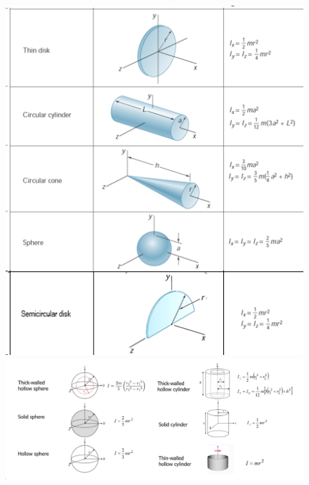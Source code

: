 \documentclass[10pt]{article}
\begin{document}
\begin{multicols*}{2}
\begin{figure}[H]
			\includegraphics[width=0.9\linewidth]{screenshot004}
			\includegraphics[width=1\linewidth]{screenshot005}
			\label{fig:screenshot003}
		\end{figure}
	\end{multicols*}
\end{document}
